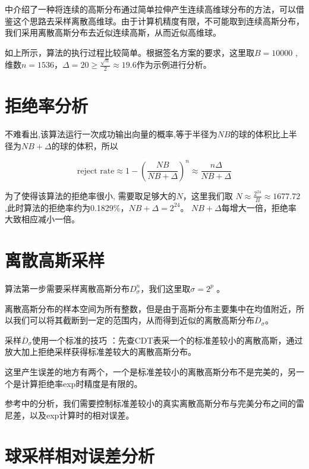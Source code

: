 \documentclass{article}
\begin{document}
\cite{voelker2017efficiently}中介绍了一种将连续的高斯分布通过简单拉伸产生连续高维球分布的方法，可以借鉴这个思路去采样离散高维球。由于计算机精度有限，不可能取到连续高斯分布，我们采用离散高斯分布去近似连续高斯，从而近似高维球。
 



如上所示，算法的执行过程比较简单。根据签名方案的要求，这里取$B = 10000 $ , 维数$n=1536$，$ \Delta = 20 \geq  \frac{\sqrt{n}}{2} \approx 19.6 $作为示例进行分析。

\section{拒绝率分析}

不难看出,该算法运行一次成功输出向量的概率,等于半径为$NB$的球的体积比上半径为$NB + \Delta$的球的体积，所以

\[
\text{reject rate} \approx 1 - \left(\frac{NB}{NB+\Delta}\right)^n \approx \frac{n\Delta}{NB+\Delta}
\]


为了使得该算法的拒绝率很小, 需要取足够大的$N$，这里我们取 $N \approx \frac{2^{24}}{B} \approx 1677.72$ ,此时算法的拒绝率约为0.1829\%，$NB+\Delta = 2^{24}$。 $NB+\Delta$每增大一倍，拒绝率大致相应减小一倍。

\section{离散高斯采样}

   算法第一步需要采样离散高斯分布$ D_\sigma ^n $，我们这里取$\sigma= 2^{p}$ 。
   
   离散高斯分布的样本空间为所有整数，但是由于高斯分布主要集中在均值附近，所以我们可以将其截断到一定的范围内，从而得到近似的离散高斯分布$\overline{D}_\sigma$。

   采样$\overline{D}_\sigma$使用一个标准的技巧\cite{ducas2013lattice,rossi2020extended} ：先查CDT表采一个的标准差较小的离散高斯，通过放大加上拒绝采样获得标准差较大的离散高斯分布。

   这里产生误差的地方有两个，一个是标准差较小的离散高斯分布不是完美的，另一个是计算拒绝率exp时精度是有限的。
   
   参考\cite{howe2020isochronous,prest2017sharper}中的分析，我们需要控制标准差较小的真实离散高斯分布与完美分布之间的雷尼差，以及exp计算时的相对误差。

\section{球采样相对误差分析}
\end{document}
